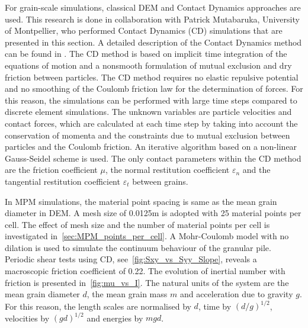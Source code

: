 For grain-scale simulations, classical DEM and Contact Dynamics approaches are 
used. This research is done in collaboration with Patrick Mutabaruka, 
University of Montpellier, who performed Contact Dynamics (CD) simulations that 
are 
presented in this section. A detailed description of the Contact Dynamics 
method can be found in \cite{Moreau1993,Jean1999,Radjai2009,Radjai2011}. 
The CD method is based on implicit time integration of the equations of motion 
and a nonsmooth formulation of mutual exclusion and dry friction between 
particles. The CD method requires no elastic repulsive potential and no 
smoothing of the Coulomb friction law for the determination of forces. 
For this reason, the simulations can be performed with large time steps 
compared to discrete element simulations. The unknown variables are particle 
velocities and contact forces, which are calculated at each time step by taking 
into account the conservation of momenta and the constraints due to mutual 
exclusion between particles and the Coulomb friction. An iterative 
algorithm based on a non-linear Gauss-Seidel scheme is used. The only 
contact 
parameters within the CD method are the friction coefficient $\mu$, the 
normal restitution coefficient $\varepsilon_n$ and the tangential restitution 
coefficient 
$\varepsilon_t$ between grains. 



In MPM simulations, the material point spacing is same as the 
mean grain diameter in DEM. A mesh size of 0.0125m is adopted with 25 material 
points per cell. The effect of mesh size and the number of material points per 
cell is investigated in~\cref{sec:MPM_points_per_cell}. A Mohr-Coulomb model 
with no dilation is used to simulate the continuum behaviour of the granular 
pile. Periodic shear tests using CD, see~\cref{fig:Sxy_vs_Syy_Slope}, reveals a 
macroscopic friction coefficient of 0.22. The evolution of inertial number with 
friction is presented in~\cref{fig:mu_vs_I}. The natural units of the system 
are the mean grain diameter $d$, the mean grain 
mass $m$ and acceleration due to gravity $g$. For this reason, the length 
scales are normalised by $d$, time by $(d/g)^{1/2}$, velocities by $(gd)^{1/2}$ 
and energies by $mgd$. 

